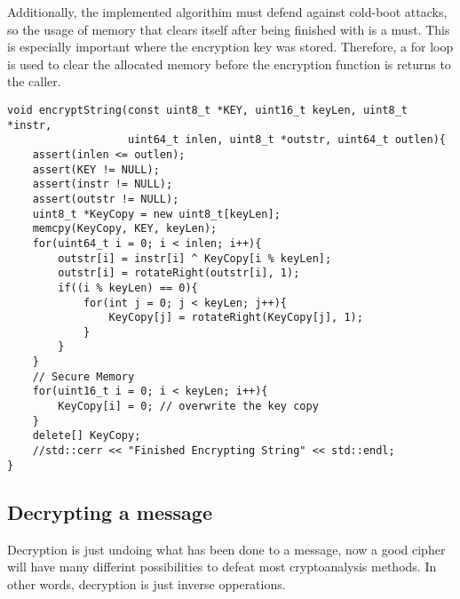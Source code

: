 \documentclass[12pt]{article}
\begin{document}
    Additionally, the implemented algorithim must defend against cold-boot
    attacks, so the usage of memory that clears itself after being finished
    with is a must. This is especially important where the encryption key
    was stored. Therefore, a for loop is used to clear the allocated memory
    before the encryption function is returns to the caller.
    
    
    \begin{lstlisting}[caption=C++ Encryption Source Code]
void encryptString(const uint8_t *KEY, uint16_t keyLen, uint8_t *instr,
                   uint64_t inlen, uint8_t *outstr, uint64_t outlen){
    assert(inlen <= outlen);
    assert(KEY != NULL);
    assert(instr != NULL);
    assert(outstr != NULL);
    uint8_t *KeyCopy = new uint8_t[keyLen];
    memcpy(KeyCopy, KEY, keyLen);
    for(uint64_t i = 0; i < inlen; i++){
        outstr[i] = instr[i] ^ KeyCopy[i % keyLen];
        outstr[i] = rotateRight(outstr[i], 1);
        if((i % keyLen) == 0){
            for(int j = 0; j < keyLen; j++){
                KeyCopy[j] = rotateRight(KeyCopy[j], 1);
            }
        }
    }
    // Secure Memory
    for(uint16_t i = 0; i < keyLen; i++){
        KeyCopy[i] = 0; // overwrite the key copy
    }
    delete[] KeyCopy;
    //std::cerr << "Finished Encrypting String" << std::endl;
}
    \end{lstlisting}

\subsection{Decrypting a message}
    Decryption is just undoing what has been done to a message, now a
    good cipher will have many differint possibilities to defeat most
    cryptoanalysis methods. In other words, decryption is just inverse
    opperations.
\end{document}
